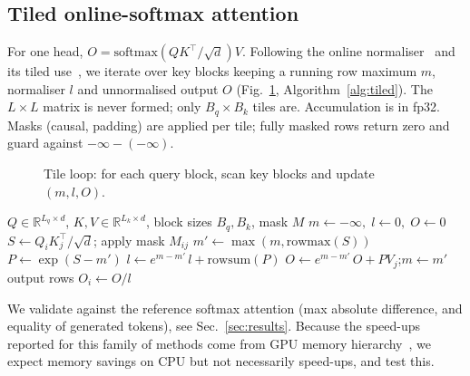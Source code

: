 \subsection{Tiled online-softmax attention}
\label{sec:attn}
For one head, $O=\mathrm{softmax}(QK^\top/\sqrt{d})V$. Following the online normaliser~\cite{milakov2018online} and its tiled use~\cite{rabe2021selfattention,dao2022flashattention}, we iterate over key blocks keeping a running row maximum $m$, normaliser $l$ and unnormalised output $O$ (Fig.~\ref{fig:tile}, Algorithm~\ref{alg:tiled}). The $L\times L$ matrix is never formed; only $B_q\times B_k$ tiles are. Accumulation is in fp32. Masks (causal, padding) are applied per tile; fully masked rows return zero and guard against $-\infty-(-\infty)$.
\begin{figure}[t]\centering
\resizebox{\columnwidth}{!}{}
\caption{Tile loop: for each query block, scan key blocks and update $(m,l,O)$.}
\label{fig:tile}
\end{figure}
\begin{algorithm}[t]
\caption{Tiled online-softmax attention (one head)}
\label{alg:tiled}
\begin{algorithmic}[1]
\Require $Q\in\mathbb{R}^{L_q\times d}$, $K,V\in\mathbb{R}^{L_k\times d}$, block sizes $B_q,B_k$, mask $M$
  \State $m\gets -\infty,\; l\gets 0,\; O\gets 0$
    \State $S\gets Q_iK_j^\top/\sqrt{d}$; apply mask $M_{ij}$
    \State $m'\gets\max(m,\mathrm{rowmax}(S))$
    \State $P\gets \exp(S-m')$
    \State $l\gets e^{m-m'}\,l+\mathrm{rowsum}(P)$
    \State $O\gets e^{m-m'}\,O+PV_j$;\quad $m\gets m'$
  \EndFor
  \State output rows $O_i\gets O/l$
\EndFor
\end{algorithmic}
\end{algorithm}
We validate against the reference softmax attention (max absolute difference, and equality of generated tokens), see Sec.~\ref{sec:results}. Because the speed-ups reported for this family of methods come from GPU memory hierarchy~\cite{dao2022flashattention}, we expect memory savings on CPU but not necessarily speed-ups, and test this.

